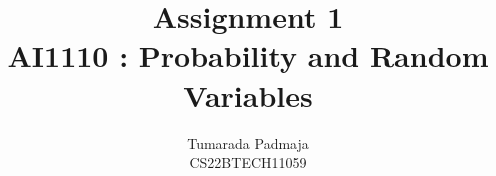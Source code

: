 \documentclass[journal,12pt,twocolumn]{IEEEtran}
\DeclareMathOperator*{\Res}{Res}
\begin{document}
\newtheorem{problem}{Problem}
\newtheorem{definition}[problem]{Definition}
\newcommand{\BEQA}{\begin{eqnarray}}
\newcommand{\EEQA}{\end{eqnarray}}



\providecommand{\mbf}{\mathbf}
\providecommand{\pr}[1]{\ensuremath{\Pr\left(#1\right)}}
\providecommand{\qfunc}[1]{\ensuremath{Q\left(#1\right)}}
\providecommand{\sbrak}[1]{\ensuremath{{}\left[#1\right]}}
\providecommand{\lsbrak}[1]{\ensuremath{{}\left[#1\right.}}
\providecommand{\rsbrak}[1]{\ensuremath{{}\left.#1\right]}}
\providecommand{\brak}[1]{\ensuremath{\left(#1\right)}}
\providecommand{\lbrak}[1]{\ensuremath{\left(#1\right.}}
\providecommand{\rbrak}[1]{\ensuremath{\left.#1\right)}}
\providecommand{\cbrak}[1]{\ensuremath{\left\{#1\right\}}}
\providecommand{\lcbrak}[1]{\ensuremath{\left\{#1\right.}}
\providecommand{\rcbrak}[1]{\ensuremath{\left.#1\right\}}}

\theoremstyle{remark}
\newtheorem{rem}{Remark}


\newcommand{\sgn}{\mathop{\mathrm{sgn}}}
\providecommand{\abs}[1]{\left\vert#1\right\vert}
\providecommand{\res}[1]{\Res\displaylimits_{#1}} 
\providecommand{\norm}[1]{\left\lVert#1\right\rVert}
\providecommand{\mtx}[1]{\mathbf{#1}}
\providecommand{\mean}[1]{E\left[ #1 \right]}
\providecommand{\fourier}{\overset{\mathcal{F}}{ \rightleftharpoons}}
\providecommand{\system}{\overset{\mathcal{H}}{ \longleftrightarrow}}
\newcommand{\solution}{\noindent \textbf{Solution: }}
\newcommand{\cosec}{\,\text{cosec}\,}
\providecommand{\dec}[2]{\ensuremath{\overset{#1}{\underset{#2}{\gtrless}}}}
\newcommand{\myvec}[1]{\ensuremath{\begin{pmatrix}#1\end{pmatrix}}}
\newcommand{\mydet}[1]{\ensuremath{\begin{vmatrix}#1\end{vmatrix}}}

\let\vec\mathbf

\vspace{3cm}

\title{
Assignment 1\\AI1110 : Probability and Random Variables
}
\author{Tumarada Padmaja\\CS22BTECH11059}
\end{document}
